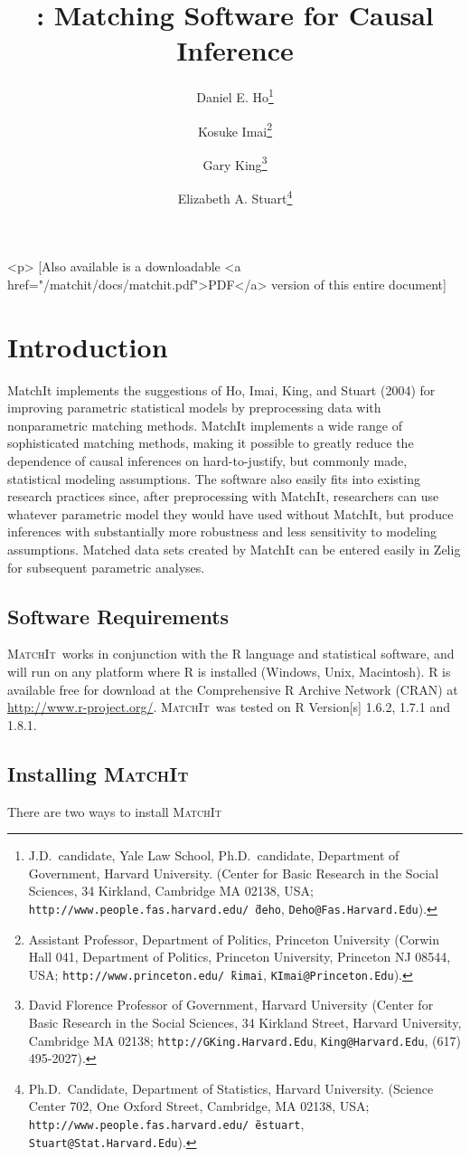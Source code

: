\documentclass[oneside,letterpaper,titlepage]{article}
\title{\MatchIt : Matching Software for Causal Inference}
\author{Daniel E. Ho\thanks{J.D.\ candidate, Yale Law School, Ph.D.\
    candidate, Department of Government, Harvard
    University. (Center for Basic Research in the Social Sciences, 34
    Kirkland, Cambridge MA 02138, USA;
    \texttt{http://www.people.fas.harvard.edu/\~\,deho},
    \texttt{Deho@Fas.Harvard.Edu}).}
\and %
Kosuke Imai\thanks{Assistant Professor, Department of Politics, Princeton
    University (Corwin Hall 041, Department of Politics, Princeton
    University, Princeton NJ 08544, USA;
    \texttt{http://www.princeton.edu/\~\,kimai},
    \texttt{KImai@Princeton.Edu}).}
\and %
Gary King\thanks{David Florence Professor of Government, Harvard
  University (Center for Basic Research in the Social Sciences, 34
  Kirkland Street, Harvard University, Cambridge MA 02138;
  \texttt{http://GKing.Harvard.Edu}, \texttt{King@Harvard.Edu}, (617)
  495-2027).}
\and %
Elizabeth A. Stuart\thanks{Ph.D.\ Candidate, Department of Statistics, Harvard
  University. (Science Center 702, One Oxford Street, Cambridge, MA
  02138, USA;
  \texttt{http://www.people.fas.harvard.edu/\~\,estuart},
  \texttt{Stuart@Stat.Harvard.Edu}).}}
\newcommand{\MatchIt}{\textsc{MatchIt}}
\begin{document}
\maketitle

\begin{rawhtml}
<p>
  [Also available is a downloadable <a href="/matchit/docs/matchit.pdf">PDF</a>
  version of this entire document]
\end{rawhtml}

\tableofcontents

\section{Introduction}
MatchIt implements the suggestions of Ho, Imai, King, and Stuart
(2004) for improving parametric statistical models by preprocessing
data with nonparametric matching methods.  MatchIt implements a wide
range of sophisticated matching methods, making it possible to greatly
reduce the dependence of causal inferences on hard-to-justify, but
commonly made, statistical modeling assumptions.  The software also
easily fits into existing research practices since, after
preprocessing with MatchIt, researchers can use whatever parametric
model they would have used without MatchIt, but produce inferences
with substantially more robustness and less sensitivity to modeling
assumptions.  Matched data sets created by MatchIt can be entered
easily in Zelig for subsequent parametric analyses.


\subsection{Software Requirements} 
\MatchIt\ works in conjunction with the R language and statistical
software, and will run on any platform where R is
installed (Windows, Unix, Macintosh).  R is available free for
download at the Comprehensive R Archive Network (CRAN) at
\url{http://www.r-project.org/}.  \MatchIt\ was tested on R Version[s]
1.6.2, 1.7.1 and 1.8.1.

\subsection{Installing \MatchIt} 

There are two ways to install \MatchIt\: 
\end{document}
